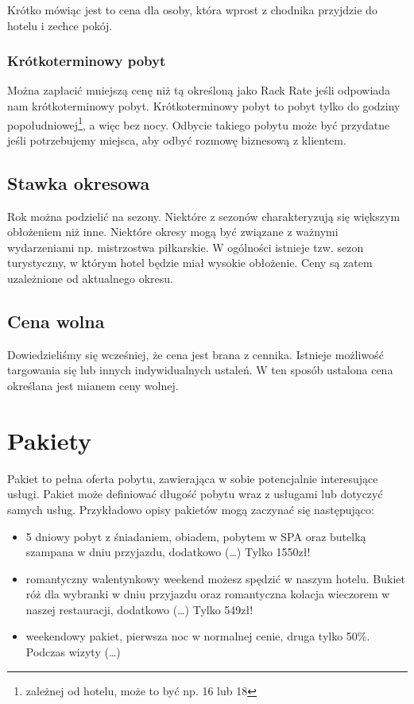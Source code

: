 \documentclass[a4paper,onecolumn,oneside,11pt,wide,floatssmall]{mwrep}
\theoremstyle{definition}
\theoremstyle{plain}%
\theoremstyle{remark}
\begin{document}
Krótko mówiąc jest to cena dla osoby, która wprost z chodnika przyjdzie do 
hotelu i zechce pokój.

\subsubsection{Krótkoterminowy pobyt}
Można zapłacić mniejszą cenę niż tą określoną jako Rack Rate jeśli odpowiada 
nam krótkoterminowy pobyt. Krótkoterminowy pobyt to pobyt tylko do godziny 
popołudniowej\footnote{zależnej od hotelu, może to być np. 16 lub 18}, a 
więc bez nocy. Odbycie takiego pobytu może być przydatne 
jeśli potrzebujemy miejsca, aby odbyć rozmowę biznesową z klientem. 

\subsection{Stawka okresowa}
Rok można podzielić na sezony. Niektóre z sezonów charakteryzują się 
większym obłożeniem niż inne. Niektóre okresy mogą być związane z ważnymi 
wydarzeniami np. mistrzostwa piłkarskie. W ogólności istnieje tzw. sezon 
turystyczny, w którym hotel będzie miał wysokie obłożenie. Ceny są zatem 
uzależnione od aktualnego okresu.

\subsection{Cena wolna}
Dowiedzieliśmy się wcześniej, że cena jest brana z cennika. Istnieje 
możliwość targowania się lub innych indywidualnych ustaleń. W ten sposób 
ustalona cena określana jest mianem ceny wolnej.

\section{Pakiety}
Pakiet to pełna oferta pobytu, zawierająca w sobie potencjalnie interesujące 
usługi. Pakiet może definiować długość pobytu wraz z usługami lub dotyczyć 
samych usług. Przykładowo opisy pakietów mogą zaczynać się następująco:

\begin{itemize}
 \item 5 dniowy pobyt z śniadaniem, obiadem, pobytem w SPA oraz butelką 
 szampana w dniu przyjazdu, dodatkowo (\dots) Tylko 1550zł!
 \item \label{pakiet-walentynki} romantyczny walentynkowy weekend możesz spędzić w naszym hotelu. 
 Bukiet róż dla wybranki w dniu przyjazdu oraz romantyczna kolacja wieczorem 
 w naszej restauracji, dodatkowo (\dots) Tylko 549zł!
 \item weekendowy pakiet, pierwsza noc w normalnej cenie, druga tylko 50\%. 
 Podczas wizyty (\dots)
\end{itemize}
\end{document}
